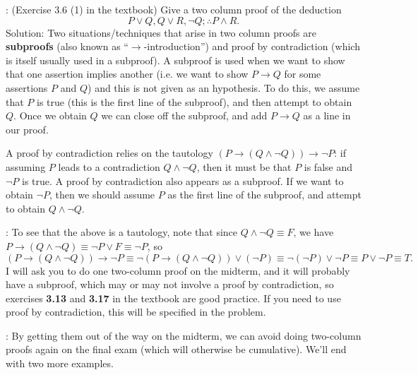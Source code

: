\documentclass[letterpaper,12pt]{article}
\begin{document}
: (Exercise 3.6 (1) in the textbook) Give a two column proof of the deduction
\[
 P\vee Q, Q\vee R, \neg Q; \therefore P\wedge R.
\]
Solution:
Two situations/techniques that arise in two column proofs are {\bf subproofs} (also known as ``$\to$-introduction'') and proof by contradiction (which is itself usually used in a subproof). A subproof is used when we want to show that one assertion implies another (i.e. we want to show $P\to Q$ for some assertions $P$ and $Q$) and this is not given as an hypothesis. To do this, we assume that $P$ is true (this is the first line of the subproof), and then attempt to obtain $Q$. Once we obtain $Q$ we can close off the subproof, and add $P\to Q$ as a line in our proof.

A proof by contradiction relies on the tautology $(P\to (Q\wedge \neg Q))\to \neg P$: if assuming $P$ leads to a contradiction $Q\wedge \neg Q$, then it must be that $P$ is false and $\neg P$ is true. A proof by contradiction also appears as a subproof. If we want to obtain $\neg P$, then we should assume $P$ as the first line of the subproof, and attempt to obtain $Q\wedge \neg Q$.

: To see that the above is a tautology, note that since $Q\wedge \neg Q \equiv F$, we have $P\to (Q\wedge \neg Q) \equiv \neg P\vee F \equiv \neg P$, so
\[
 (P\to (Q\wedge \neg Q))\to \neg P \equiv \neg (P\to (Q\wedge \neg Q))\vee (\neg P)\equiv \neg (\neg P)\vee \neg P \equiv P\vee\neg P\equiv T.
\]
I will ask you to do one two-column proof on the midterm, and it will probably have a subproof, which may or may not involve a proof by contradiction, so exercises {\bf 3.13} and {\bf 3.17} in the textbook are good practice. If you need to use proof by contradiction, this will be specified in the problem. 

: By getting them out of the way on the midterm, we can avoid doing two-column proofs again on the final exam (which will otherwise be cumulative). We'll end with two more examples.


\end{document}
